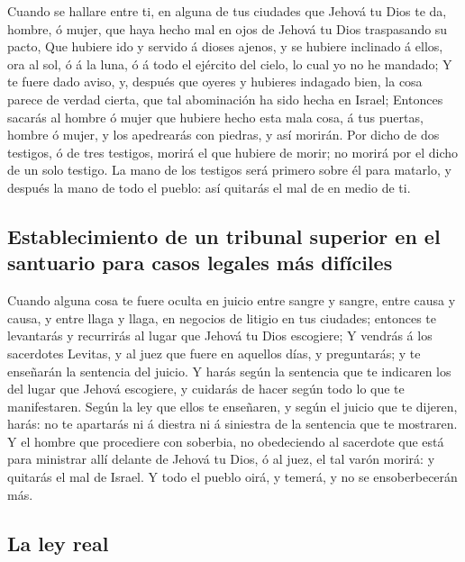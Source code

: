 Cuando se hallare entre ti, en alguna de tus ciudades que
Jehová tu Dios te da, hombre, ó mujer, que haya hecho mal en ojos de
Jehová tu Dios traspasando su pacto,  Que hubiere ido y
servido á dioses ajenos, y se hubiere inclinado á ellos, ora al sol, ó á
la luna, ó á todo el ejército del cielo, lo cual yo no he mandado;
 Y te fuere dado aviso, y, después que oyeres y hubieres
indagado bien, la cosa parece de verdad cierta, que tal abominación ha
sido hecha en Israel;  Entonces sacarás al hombre ó mujer
que hubiere hecho esta mala cosa, á tus puertas, hombre ó mujer, y los
apedrearás con piedras, y así morirán.  Por dicho de dos
testigos, ó de tres testigos, morirá el que hubiere de morir; no morirá
por el dicho de un solo testigo.  La mano de los testigos
será primero sobre él para matarlo, y después la mano de todo el pueblo:
así quitarás el mal de en medio de ti.

\hypertarget{establecimiento-de-un-tribunal-superior-en-el-santuario-para-casos-legales-muxe1s-difuxedciles}{%
\subsection{Establecimiento de un tribunal superior en el santuario para
casos legales más
difíciles}\label{establecimiento-de-un-tribunal-superior-en-el-santuario-para-casos-legales-muxe1s-difuxedciles}}

 Cuando alguna cosa te fuere oculta en juicio entre sangre y
sangre, entre causa y causa, y entre llaga y llaga, en negocios de
litigio en tus ciudades; entonces te levantarás y recurrirás al lugar
que Jehová tu Dios escogiere;  Y vendrás á los sacerdotes
Levitas, y al juez que fuere en aquellos días, y preguntarás; y te
enseñarán la sentencia del juicio.  Y harás según la
sentencia que te indicaren los del lugar que Jehová escogiere, y
cuidarás de hacer según todo lo que te manifestaren.  Según
la ley que ellos te enseñaren, y según el juicio que te dijeren, harás:
no te apartarás ni á diestra ni á siniestra de la sentencia que te
mostraren.  Y el hombre que procediere con soberbia, no
obedeciendo al sacerdote que está para ministrar allí delante de Jehová
tu Dios, ó al juez, el tal varón morirá: y quitarás el mal de Israel.
 Y todo el pueblo oirá, y temerá, y no se ensoberbecerán
más.

\hypertarget{la-ley-real}{%
\subsection{La ley real}\label{la-ley-real}}

